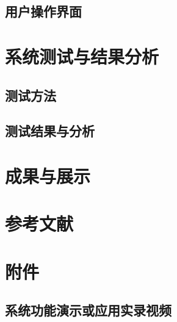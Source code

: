 		\newpage

		\subsection{用户操作界面} %
		\label{sub:用户操作界面}
		
	\newpage

	\section{系统测试与结果分析} %
	\label{sec:系统测试与结果分析}
		\subsection{测试方法} %
		\label{sub:测试方法}
		
		\newpage

		\subsection{测试结果与分析} %
		\label{sub:测试结果与分析}
		
	\newpage

	\section{成果与展示} %
	\label{sec:成果与展示}
		

	\section{参考文献} %
	\label{sec:参考文献}
	
	\newpage

	\section{附件} %
	\label{sec:附件}
		\subsection{系统功能演示或应用实录视频} %
		\label{sub:系统功能演示或应用实录视频}
		
		\newpage

